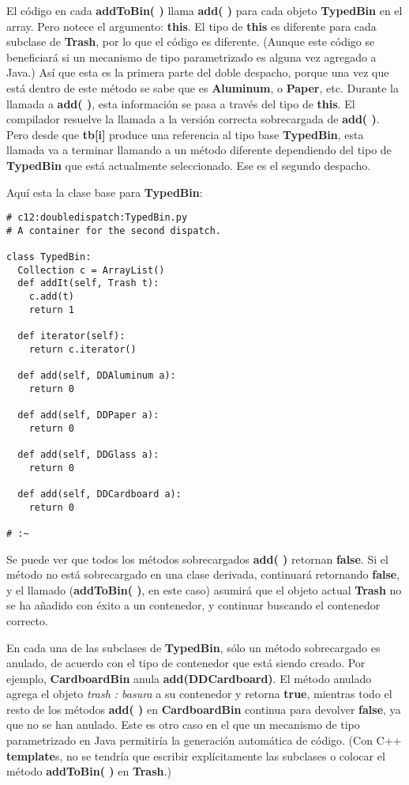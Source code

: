 El código en cada \textbf{addToBin( )} llama \textbf{add( )} para cada objeto \textbf{TypedBin} en el array. Pero notece el argumento: \textbf{this}. El tipo de \textbf{this} es diferente para cada subclase de \textbf{Trash}, por lo que el código es diferente. (Aunque este código se beneficiará si un mecanismo de tipo parametrizado es alguna vez agregado a Java.) Así que esta es la primera parte del doble despacho, porque una vez que está dentro de este método se sabe que es \textbf{Aluminum},  o \textbf{Paper}, etc. Durante la llamada a \textbf{add( )}, esta información se pasa a través del tipo de \textbf{this}. El compilador resuelve la llamada a la versión correcta sobrecargada de \textbf{add( )}. Pero desde que \textbf{tb[i]} produce una referencia al tipo base \textbf{TypedBin}, esta llamada va a terminar llamando a un método diferente dependiendo del tipo de \textbf{TypedBin} que está actualmente seleccionado. Ese es el segundo despacho. \newline

Aquí esta la clase base para \textbf{TypedBin}:         \newline

\begin{lstlisting} 
# c12:doubledispatch:TypedBin.py 
# A container for the second dispatch. 

class TypedBin: 
  Collection c = ArrayList() 
  def addIt(self, Trash t): 
    c.add(t) 
    return 1 
    
  def iterator(self): 
    return c.iterator() 
    
  def add(self, DDAluminum a): 
    return 0 
    
  def add(self, DDPaper a): 
    return 0 
    
  def add(self, DDGlass a): 
    return 0 
    
  def add(self, DDCardboard a): 
    return 0 
    
# :~ 
\end{lstlisting}

Se puede ver que todos los métodos sobrecargados \textbf{add( )} retornan  \textbf{false}. Si el método no está sobrecargado en una clase derivada, continuará retornando \textbf{false},  y el llamado (\textbf{addToBin( )}, en este caso)  asumirá que el objeto actual \textbf{Trash} no se ha añadido con éxito a un contenedor, y continuar buscando el contenedor correcto.         \newline

En cada una de las subclases de \textbf{TypedBin}, sólo un método sobrecargado es anulado, de acuerdo con el tipo de contenedor que está siendo creado. Por ejemplo, \textbf{CardboardBin} anula \textbf{add(DDCardboard)}. El método anulado agrega el objeto\textit{ trash : basura} a su contenedor y retorna \textbf{true}, mientras todo el resto de los métodos \textbf{add( )} en \textbf{CardboardBin} continua para devolver \textbf{false}, ya que no se han anulado. Este es otro caso en el que un mecanismo de tipo parametrizado en Java permitiría la generación automática de código. (Con C++ \textbf{template}s, no se tendría que escribir explícitamente las subclases o colocar el método \textbf{addToBin( )} en \textbf{Trash}.)      \newline

